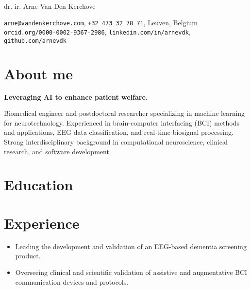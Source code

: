 \documentclass{resume}
\begin{document}
{\Large dr. ir. Arne Van Den Kerchove}
\smallskip

\texttt{arne@vandenkerchove.com}\sep
\texttt{+32 473 32 78 71}\sep
Leuven, Belgium\\
\texttt{orcid.org/0000-0002-9367-2986}\sep
\texttt{linkedin.com/in/arnevdk}\sep
\texttt{github.com/arnevdk}

\section{About me}

\textbf{Leveraging AI to enhance patient welfare.}
\smallskip

Biomedical engineer and postdoctoral researcher specializing in machine learning
for neurotechnology.
Experienced in brain-computer interfacing (BCI) methods and applications, EEG data classification, and real-time biosignal processing.
Strong interdisciplinary background in computational neuroscience, clinical
research, and software development.


\section{Education}
\smallskip

\smallskip

\smallskip


\section{Experience}
\begin{itemize}
	\item Leading the development and validation of an EEG-based dementia screening product.
	\item Overseeing clinical and scientific validation of assistive and augmentative BCI communication devices and protocols.
\end{itemize}
\bigskip
\end{document}
